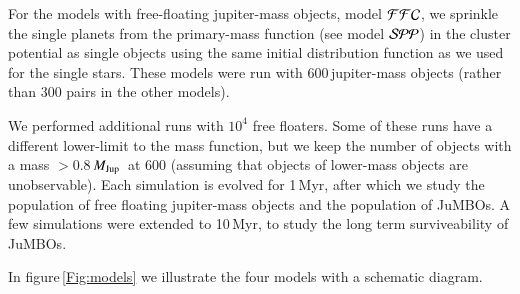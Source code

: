 \documentclass[submission,phys]{lib/SciPost}
\newcommand{\MJup}{\mbox{${M}_{\rm Jup}$}}
\newcommand{\jumbos}{\mbox{JuMBOs}}
\begin{document}
For the models with free-floating jupiter-mass objects, model ${\cal
  FFC}$, we sprinkle the single planets from the primary-mass function
(see model ${\cal SPP}$) in the cluster potential as single objects
using the same initial distribution function as we used for the single
stars.  These models were run with 600\,jupiter-mass objects (rather
than 300 pairs in the other models).

We performed additional runs with $10^4$ free floaters. Some of these
runs have a different lower-limit to the mass function, but we keep
the number of objects with a mass $>0.8$\,\MJup\, at 600 (assuming
that objects of lower-mass objects are unobservable).  Each simulation
is evolved for 1\,Myr, after which we study the population of free
floating jupiter-mass objects and the population of \jumbos. A few
simulations were extended to 10\,Myr, to study the long term
surviveability of \jumbos.

In figure\,\ref{Fig:models} we illustrate the four models with a
schematic diagram.
\end{document}
